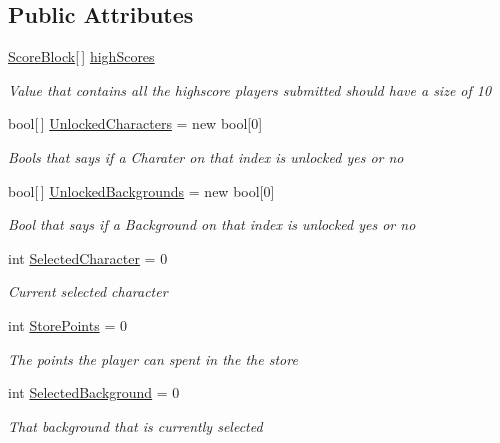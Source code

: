 \subsection*{Public Attributes}
\begin{DoxyCompactItemize}
\item 
\hyperlink{struct_save_data_1_1_score_block}{Score\+Block}\mbox{[}$\,$\mbox{]} \hyperlink{class_save_data_ad6b597fae588561b2cab802255210781}{high\+Scores}
\begin{DoxyCompactList}\small\item\em Value that contains all the highscore players submitted should have a size of 10 \end{DoxyCompactList}\item 
bool\mbox{[}$\,$\mbox{]} \hyperlink{class_save_data_af0386c50f7a6c086d961118aa6f80b24}{Unlocked\+Characters} = new bool\mbox{[}0\mbox{]}
\begin{DoxyCompactList}\small\item\em Bools that says if a Charater on that index is unlocked yes or no \end{DoxyCompactList}\item 
bool\mbox{[}$\,$\mbox{]} \hyperlink{class_save_data_a6989ed440d66cee33ae1a8501af3d1be}{Unlocked\+Backgrounds} = new bool\mbox{[}0\mbox{]}
\begin{DoxyCompactList}\small\item\em Bool that says if a Background on that index is unlocked yes or no \end{DoxyCompactList}\item 
int \hyperlink{class_save_data_a6f8a789b4a102c7ae5038ff8a8c86088}{Selected\+Character} = 0
\begin{DoxyCompactList}\small\item\em Current selected character \end{DoxyCompactList}\item 
int \hyperlink{class_save_data_a96bd1137583a956bca2e7bd26cd11f89}{Store\+Points} = 0
\begin{DoxyCompactList}\small\item\em The points the player can spent in the the store \end{DoxyCompactList}\item 
int \hyperlink{class_save_data_afc48c9d7e880061617adfc388800f8bb}{Selected\+Background} = 0
\begin{DoxyCompactList}\small\item\em That background that is currently selected \end{DoxyCompactList}\end{DoxyCompactItemize}


